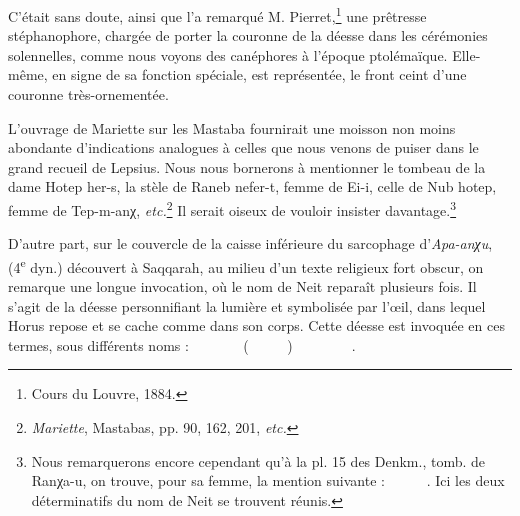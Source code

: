 \documentclass[letterpaper,twocolumn,openany,nodeprecatedcode]{dndbook}
\newcommand*\hieroAAAH{}
\newcommand*\hieroAAAO{}
\newcommand*\hieroAAAQ{}
\newcommand*\hieroAAAX{}
\newcommand*\hieroAABF{}
\newcommand*\hieroAACB{\raisebox{0.5ex}{}}
\newcommand*\hieroAACL{\raisebox{0.5ex}{}}
\newcommand*\hieroAACM{}
\newcommand*\hieroAACP{}
\newcommand*\hieroAADF{}
\newcommand*\hieroAAEB{}
\newcommand*\hieroAAEK{}
\newcommand*\hieroAAEZ{}
\newcommand*\hieroAAHC{}
\newcommand*\hieroAAIK{}
\newcommand*\hieroAAIS{}
\newcommand*\hieroAAJN{}
\newcommand*\hieroAALA{}
\newcommand*\hieroAALU{\raisebox{0.5ex}{}}
\newcommand*\hieroAALX{\raisebox{0.5ex}{}}
\newcommand*\hieroAAOL{}
\newcommand*\hieroAAQC{}
\newcommand*\hieroAARM{}
\newcommand*\hieroAARN{}
\newcommand*\hieroAARO{}
\newcommand*\hieroAARR{}
\newcommand*\hieroAARS{}
\newcommand*\hieroAART{}
\newcommand*\hieroAARU{}
\newcommand*\hieroAARV{}
\newcommand*\hieroAARW{}
\newcommand*\hieroAARX{}
\newcommand*\hieroAARY{}
\newcommand*\hieroAARZ{}
\newcommand*\hieroAASA{}
\newcommand*\hieroAASB{}
\newcommand*\hieroAASC{}
\begin{document}
C'était sans doute, ainsi que l'a remarqué M. Pierret,\footnote{Cours du Louvre, 1884.} une prêtresse stéphanophore, chargée de porter la couronne de la déesse dans les cérémonies solennelles, comme nous voyons des canéphores à l'époque ptolémaïque. Elle-même, en signe de sa fonction spéciale, est représentée, le front ceint d'une couronne très-ornementée.

L'ouvrage de Mariette sur les Mastaba fournirait une moisson non moins abondante d'indications analogues à celles que nous venons de puiser dans le grand recueil de Lepsius. Nous nous bornerons à mentionner le tombeau de la dame Hotep her-s, la stèle de Raneb nefer-t, femme de Ei-i, celle de Nub hotep, femme de Tep-m-anχ, \emph{etc.}\footnote{\emph{Mariette}, Mastabas, pp. 90, 162, 201, \emph{etc.}} Il serait oiseux de vouloir insister davantage.\footnote{Nous remarquerons encore cependant qu'à la pl. 15 des Denkm., tomb. de Ranχa-u, on trouve, pour sa femme, la mention suivante : $\hieroAAAX\:\hieroAARO\:\hieroAARM\allowbreak\:\hieroAAEK\:\hieroAAHC\:\hieroAAAQ\allowbreak\:\hieroAABF\:\hieroAAAO\:\hieroAAEK\allowbreak\:\hieroAAHC\:\hieroAARR\allowbreak\:\hieroAARS\:\hieroAARR$. Ici les deux déterminatifs du nom de Neit se trouvent réunis.}

D'autre part, sur le couvercle de la caisse inférieure du sarcophage d'\emph{Apa-anχu}, (4\textsuperscript{e} dyn.) découvert à Saqqarah, au milieu d'un texte religieux fort obscur, on remarque une longue invocation, où le nom de Neit reparaît plusieurs fois. Il s'agit de la déesse personnifiant la lumière et symbolisée par l'œil, dans lequel Horus repose et se cache comme dans son corps. Cette déesse est invoquée en ces termes, sous différents noms : $\hieroAALU\:\hieroAAAH\:\hieroAADF\allowbreak\:\hieroAAAQ\:\hieroAAQC\:\hieroAALU\allowbreak\:\hieroAAAH\:\hieroAADF\:\hieroAAAH\allowbreak\:\hieroAART\:\hieroAACL\:\hieroAARN\allowbreak\:\hieroAALU\:\hieroAAAH\:\hieroAADF$ ($\hieroAAJN\:\hieroAACB\:\hieroAALA\allowbreak\:\hieroAALU\:\hieroAAAH\:\hieroAADF\allowbreak\:\hieroAARU\:\hieroAAEZ\:\hieroAARV\allowbreak\:\hieroAALA\:\hieroAALU\allowbreak\:\hieroAAAH\:\hieroAADF$) $\hieroAARW\:\hieroAACB\:\hieroAARN\allowbreak\:\hieroAAIK\:\hieroAALX\:\hieroAARX\allowbreak\:\hieroAARY\:\hieroAAAQ\:\hieroAAAH\allowbreak\:\hieroAACP\:\hieroAARZ\:\hieroAACM\allowbreak\:\hieroAAEB\:\hieroAAOL\:\hieroAAIS\allowbreak\:\hieroAASA\:\hieroAASB\:\hieroAASC\hieroAASC\hieroAASC\hieroAASC\hieroAASC\hieroAASC\hieroAASC\hieroAASC\hieroAASC\hieroAASC\hieroAASC$.
\end{document}
